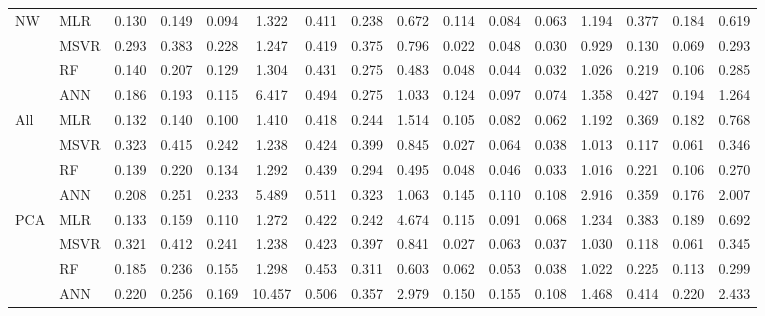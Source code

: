\documentclass[conference]{IEEEtran}
\begin{document}
\begin{table*}
\begin{tabular}{|p{0.8cm}|p{0.8cm}||c|c||c|c|c|c|c|c|c|c|c|c|c|c|}
\cline{2-16}
\hline
\hline
\multirow{4}{*}{NW} &MLR &   0.130 &    0.149 &    0.094 &    1.322 &    0.411 &    0.238 &    0.672 &    0.114 &    0.084 &    0.063 &    1.194 &    0.377 &    0.184 &    0.619\\
\cline{2-16}
 &MSVR &   0.293 &    0.383 &    0.228 &    1.247 &    0.419 &    0.375 &    0.796 &    0.022 &    0.048 &    0.030 &    0.929 &    0.130 &    0.069 &    0.293\\
\cline{2-16}
 &RF &   0.140 &    0.207 &    0.129 &    1.304 &    0.431 &    0.275 &    0.483 &    0.048 &    0.044 &    0.032 &    1.026 &    0.219 &    0.106 &    0.285\\
\cline{2-16}
 &ANN &   0.186 &    0.193 &    0.115 &    6.417 &    0.494 &    0.275 &    1.033 &    0.124 &    0.097 &    0.074 &    1.358 &    0.427 &    0.194 &    1.264\\
\cline{2-16}
\hline
\hline
\multirow{4}{*}{All} &MLR &   0.132 &    0.140 &    0.100 &    1.410 &    0.418 &    0.244 &    1.514 &    0.105 &    0.082 &    0.062 &    1.192 &    0.369 &    0.182 &    0.768\\
\cline{2-16}
 &MSVR &   0.323 &    0.415 &    0.242 &    1.238 &    0.424 &    0.399 &    0.845 &    0.027 &    0.064 &    0.038 &    1.013 &    0.117 &    0.061 &    0.346\\
\cline{2-16}
 &RF &   0.139 &    0.220 &    0.134 &    1.292 &    0.439 &    0.294 &    0.495 &    0.048 &    0.046 &    0.033 &    1.016 &    0.221 &    0.106 &    0.270\\
\cline{2-16}
 &ANN &   0.208 &    0.251 &    0.233 &    5.489 &    0.511 &    0.323 &    1.063 &    0.145 &    0.110 &    0.108 &    2.916 &    0.359 &    0.176 &    2.007\\
\cline{2-16}
\hline
\hline
\multirow{4}{*}{PCA} &MLR &   0.133 &    0.159 &    0.110 &    1.272 &    0.422 &    0.242 &    4.674 &    0.115 &    0.091 &    0.068 &    1.234 &    0.383 &    0.189 &    0.692\\
\cline{2-16}
 &MSVR &   0.321 &    0.412 &    0.241 &    1.238 &    0.423 &    0.397 &    0.841 &    0.027 &    0.063 &    0.037 &    1.030 &    0.118 &    0.061 &    0.345\\
\cline{2-16}
 &RF &   0.185 &    0.236 &    0.155 &    1.298 &    0.453 &    0.311 &    0.603 &    0.062 &    0.053 &    0.038 &    1.022 &    0.225 &    0.113 &    0.299\\
\cline{2-16}
 &ANN &   0.220 &    0.256 &    0.169 &    10.457 &    0.506 &    0.357 &    2.979 &    0.150 &    0.155 &    0.108 &    1.468 &    0.414 &    0.220 &    2.433\\

\end{tabular}
\end{table*}
\end{document}
